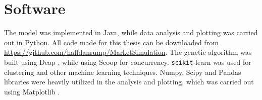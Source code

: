\section{Software}\label{AppendixB} %
The model was implemented in Java, while data analysis and plotting was carried out in Python. All code made for this thesis can be downloaded from \url{https://github.com/halfdanrump/MarketSimulation}. The genetic algorithm was built using Deap \cite{rainville2012deap}, while using Scoop \cite{arslan2006scoop} for concurrency. \texttt{scikit}-learn \cite{pedregosa2011scikit} was used for clustering and other machine learning techniques. Numpy, Scipy and Pandas libraries \cite{van2011numpy, oliphant2006guide, jones2001scipy} were heavily utilized in the analysis and plotting, which was carried out using Matplotlib \cite{hunter2007matplotlib}.